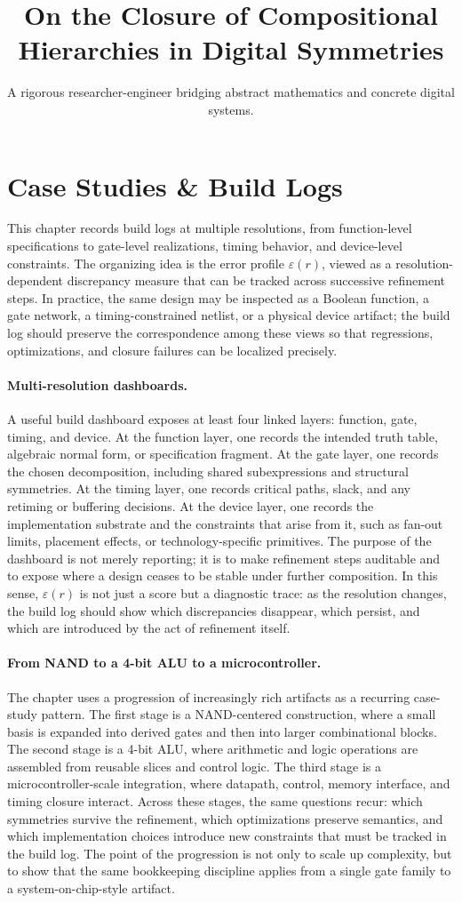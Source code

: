 \documentclass[11pt]{article}
\title{On the Closure of Compositional Hierarchies in Digital Symmetries}
\author{A rigorous researcher-engineer bridging abstract mathematics and concrete digital systems.}
\begin{document}
\section*{Case Studies \& Build Logs}

This chapter records build logs at multiple resolutions, from function-level specifications to gate-level realizations, timing behavior, and device-level constraints. The organizing idea is the error profile \(\varepsilon(r)\), viewed as a resolution-dependent discrepancy measure that can be tracked across successive refinement steps. In practice, the same design may be inspected as a Boolean function, a gate network, a timing-constrained netlist, or a physical device artifact; the build log should preserve the correspondence among these views so that regressions, optimizations, and closure failures can be localized precisely.

\paragraph{Multi-resolution dashboards.}
A useful build dashboard exposes at least four linked layers: function, gate, timing, and device. At the function layer, one records the intended truth table, algebraic normal form, or specification fragment. At the gate layer, one records the chosen decomposition, including shared subexpressions and structural symmetries. At the timing layer, one records critical paths, slack, and any retiming or buffering decisions. At the device layer, one records the implementation substrate and the constraints that arise from it, such as fan-out limits, placement effects, or technology-specific primitives. The purpose of the dashboard is not merely reporting; it is to make refinement steps auditable and to expose where a design ceases to be stable under further composition. In this sense, \(\varepsilon(r)\) is not just a score but a diagnostic trace: as the resolution changes, the build log should show which discrepancies disappear, which persist, and which are introduced by the act of refinement itself.

\paragraph{From NAND to a 4-bit ALU to a microcontroller.}
The chapter uses a progression of increasingly rich artifacts as a recurring case-study pattern. The first stage is a NAND-centered construction, where a small basis is expanded into derived gates and then into larger combinational blocks. The second stage is a 4-bit ALU, where arithmetic and logic operations are assembled from reusable slices and control logic. The third stage is a microcontroller-scale integration, where datapath, control, memory interface, and timing closure interact. Across these stages, the same questions recur: which symmetries survive the refinement, which optimizations preserve semantics, and which implementation choices introduce new constraints that must be tracked in the build log. The point of the progression is not only to scale up complexity, but to show that the same bookkeeping discipline applies from a single gate family to a system-on-chip-style artifact.
\end{document}
